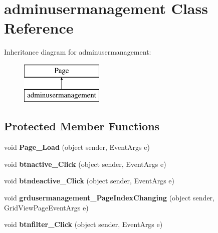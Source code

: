 \hypertarget{classadminusermanagement}{\section{adminusermanagement Class Reference}
\label{classadminusermanagement}
}
Inheritance diagram for adminusermanagement\-:\begin{figure}[H]
\begin{center}
\leavevmode
\includegraphics[height=2.000000cm]{classadminusermanagement}
\end{center}
\end{figure}
\subsection*{Protected Member Functions}
\begin{DoxyCompactItemize}
\item 
\hypertarget{classadminusermanagement_a517412da8a8db5bf157577fb071e7a49}{void {\bfseries Page\-\_\-\-Load} (object sender, Event\-Args e)}\label{classadminusermanagement_a517412da8a8db5bf157577fb071e7a49}

\item 
\hypertarget{classadminusermanagement_ae2bf386505932b34e197e30355135a6a}{void {\bfseries btnactive\-\_\-\-Click} (object sender, Event\-Args e)}\label{classadminusermanagement_ae2bf386505932b34e197e30355135a6a}

\item 
\hypertarget{classadminusermanagement_ad5d45dcf72259853a1c5ce0d5148d831}{void {\bfseries btndeactive\-\_\-\-Click} (object sender, Event\-Args e)}\label{classadminusermanagement_ad5d45dcf72259853a1c5ce0d5148d831}

\item 
\hypertarget{classadminusermanagement_aaf1a3d6b619f4a11db8b4a56ba7b41b1}{void {\bfseries grdusermanagement\-\_\-\-Page\-Index\-Changing} (object sender, Grid\-View\-Page\-Event\-Args e)}\label{classadminusermanagement_aaf1a3d6b619f4a11db8b4a56ba7b41b1}

\item 
\hypertarget{classadminusermanagement_ab8b2fb96a95adc5b0274178179b511cc}{void {\bfseries btnfilter\-\_\-\-Click} (object sender, Event\-Args e)}\label{classadminusermanagement_ab8b2fb96a95adc5b0274178179b511cc}

\end{DoxyCompactItemize}


